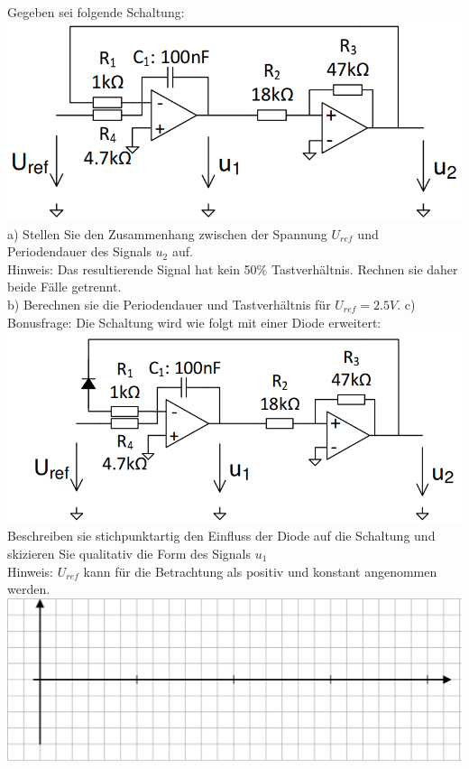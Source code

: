 \documentclass[A4]{scrreprt}
\begin{document}
  Gegeben sei folgende Schaltung:\\
  \includegraphics{Schaltung15.png}\\
  a) Stellen Sie den Zusammenhang zwischen der Spannung $U_{ref}$ und Periodendauer des Signals $u_2$ auf.\\
  Hinweis: Das resultierende Signal hat kein 50\% Tastverhältnis. Rechnen sie daher beide Fälle getrennt.\\
  b) Berechnen sie die Periodendauer und Tastverhältnis für $U_{ref} = 2.5V$.
  c) Bonusfrage: Die Schaltung wird wie folgt mit einer Diode erweitert:\\
  \includegraphics{Schaltung16.png}\\
  Beschreiben sie stichpunktartig den Einfluss der Diode auf die Schaltung und skizieren Sie qualitativ die Form des Signals $u_1$\\
  Hinweis: $U_{ref}$ kann für die Betrachtung als positiv und konstant angenommen werden.\\
  \includegraphics{pot_dia.png}
\end{document}
